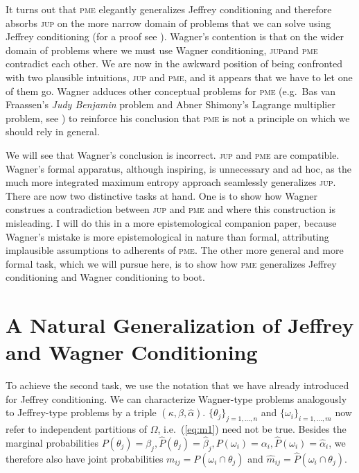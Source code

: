 \documentclass[11pt]{article}
\begin{document}
It turns out that \textsc{pme} elegantly generalizes Jeffrey
conditioning and therefore absorbs \textsc{jup} on the more narrow
domain of problems that we can solve using Jeffrey conditioning (for a
proof see ). Wagner's contention is that
on the wider domain of problems where we must use Wagner conditioning,
\textsc{jup}and \textsc{pme} contradict each other. We are now in the
awkward position of being confronted with two plausible intuitions,
\textsc{jup} and \textsc{pme}, and it appears that we have to let one
of them go. Wagner adduces other conceptual problems for \textsc{pme}
(e.g.\ Bas van Fraassen's \emph{Judy Benjamin} problem and Abner
Shimony's Lagrange multiplier problem, see
) to reinforce his conclusion that
\textsc{pme} is not a principle on which we should rely in general.

We will see that Wagner's conclusion is incorrect. \textsc{jup} and
\textsc{pme} are compatible. Wagner's formal apparatus, although
inspiring, is unnecessary and ad hoc, as the much more integrated
maximum entropy approach seamlessly generalizes \textsc{jup}. There
are now two distinctive tasks at hand. One is to show how Wagner
construes a contradiction between \textsc{jup} and \textsc{pme} and
where this construction is misleading. I will do this in a more
epistemological companion paper, because Wagner's mistake is more
epistemological in nature than formal, attributing implausible
assumptions to adherents of \textsc{pme}. The other more general and
more formal task, which we will pursue here, is to show how
\textsc{pme} generalizes Jeffrey conditioning and Wagner conditioning
to boot.

\section{A Natural Generalization of Jeffrey and Wagner Conditioning}
\label{Generalization}

To achieve the second task, we use the notation that we have already
introduced for Jeffrey conditioning. We can characterize Wagner-type
problems analogously to Jeffrey-type problems by a triple
$(\kappa,\beta,\hat{\alpha})$.
$\{\theta_{j}\}_{j=1,\ldots,n}$ and $\{\omega_{i}\}_{i=1,\ldots,m}$
now refer to independent partitions of $\Omega$, i.e.\ (\ref{eq:m1})
need not be true. Besides the marginal probabilities
$P(\theta_{j})=\beta_{j}, \hat{P}(\theta_{j})=\hat{\beta}_{j},
P(\omega_{i})=\alpha_{i},\hat{P}(\omega_{i})=\hat{\alpha}_{i}$, we
therefore also have joint probabilities
$m_{ij}=P(\omega_{i}\cap\theta_{j})$ and
$\hat{m}_{ij}=\hat{P}(\omega_{i}\cap\theta_{j})$.
\end{document}
